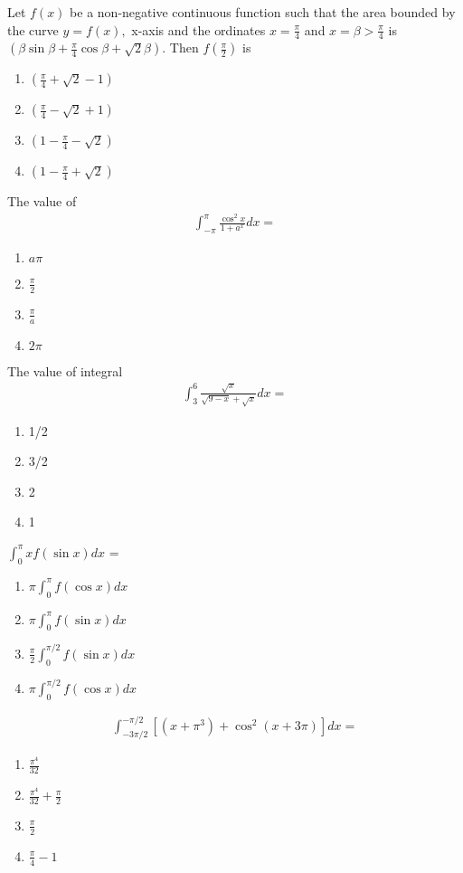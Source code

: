 \item Let $f(x)$ be a non-negative continuous function such that the area bounded by the curve $y = f(x),$ x-axis and the ordinates $x = \frac{\pi}{4}$ and $x = \beta > \frac{\pi}{4}$ is $\left(\beta\sin \beta + \frac{\pi}{4}\cos \beta + \sqrt{2}\beta\right)$. Then $f(\frac{\pi}{2})$ is
\begin{enumerate}
\item $\left(\frac{\pi}{4} + \sqrt{2} -1\right)$
\item $\left(\frac{\pi}{4} - \sqrt{2} +1\right)$
\item $\left(1 - \frac{\pi}{4} - \sqrt{2}\right)$
\item $\left(1 - \frac{\pi}{4} + \sqrt{2}\right)$
\end{enumerate} 

\item The value of
\begin{align*}
\int_{-\pi}^{\pi}\frac{\cos^{2}x}{1 + a^x}dx = 
\end{align*}
\begin{enumerate}
\item $a\pi$
\item $\frac{\pi}{2}$
\item $\frac{\pi}{a}$
\item $2\pi$
\end{enumerate}

\item The value of integral
\begin{align*}
\int_{3}^{6}\frac{\sqrt{x}}{\sqrt{9 - x} + \sqrt{x}}dx = 
\end{align*}
\begin{enumerate}
\item 1/2
\item 3/2
\item 2
\item 1
\end{enumerate}

\item $\int_{0}^{\pi}xf(\sin x)dx$ = 
\begin{enumerate}
\item $\pi\int_{0}^{\pi}f(\cos x)dx$
\item $\pi\int_{0}^{\pi}f(\sin x)dx$
\item $\frac{\pi}{2}\int_{0}^{\pi/2}f(\sin x)dx$
\item $\pi\int_{0}^{\pi/2}f(\cos x)dx$
\end{enumerate}

\item 
\begin{align*}
\int_{-3\pi/2}^{-\pi/2}[(x + \pi^3) + \cos^{2}(x + 3\pi)]dx =
\end{align*} 
\begin{enumerate}
\item $\frac{\pi^{4}}{32}$
\item $\frac{\pi^{4}}{32} + \frac{\pi}{2}$
\item $\frac{\pi}{2}$
\item $\frac{\pi}{4} - 1$
\end{enumerate}

